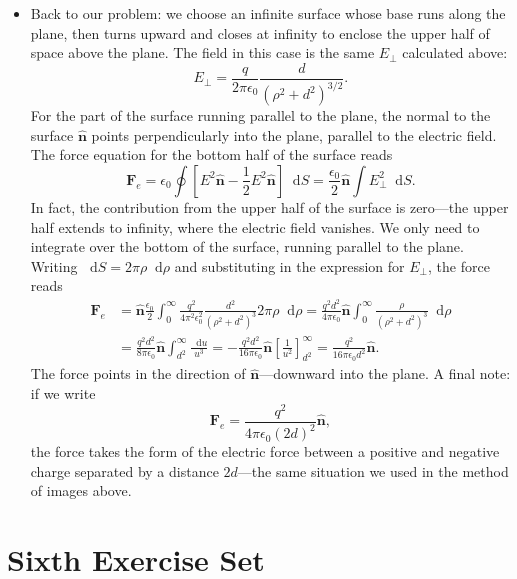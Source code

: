 \documentclass[11pt, a4paper]{article}
\newcommand{\diff}{\mathop{}\!\mathrm{d}} %
\renewcommand{\vec}[1]{\bm{#1}} %
\newcommand{\uvec}[1]{\hat{\vec{#1}}} %
\newcommand{\ee}{\epsilon_{0}}  %
\begin{document}
\begin{itemize}
	\item Back to our problem: we choose an infinite surface whose base runs along the plane, then turns upward and closes at infinity to enclose the upper half of space above the plane. The field in this case is the same $ E_{\perp} $ calculated above:
	\begin{equation*}
		E_{\perp} = \frac{q}{2\pi \ee}\frac{d}{(\rho^{2}+d^{2})^{3/2}}.
	\end{equation*}
	For the part of the surface running parallel to the plane, the normal to the surface $ \uvec{n} $ points perpendicularly into the plane, parallel to the electric field. The force equation for the bottom half of the surface reads 
	\begin{equation*}
		\vec{F}_{e} = \ee \oint \left[E^{2}\uvec{n}- \frac{1}{2}E^{2}\uvec{n}\right]\diff S = \frac{\ee}{2}\uvec{n}\int E_{\perp}^{2}\diff S.
	\end{equation*}
	In fact, the contribution from the upper half of the surface is zero---the upper half extends to infinity, where the electric field vanishes. We only need to integrate over the bottom of the surface, running parallel to the plane. Writing $ \diff S = 2\pi \rho \diff \rho $ and substituting in the expression for $ E_{\perp} $, the force reads
	\begin{align*}
		\vec{F}_{e} &= \uvec{n}\frac{\ee}{2}\int_{0}^{\infty} \frac{q^{2}}{4\pi^{2}\ee^{2}}\frac{d^{2}}{(\rho^{2} + d^{2})^{3}} 2\pi \rho \diff \rho = \frac{q^{2}d^{2}}{4\pi \ee}\uvec{n}\int_{0}^{\infty}\frac{\rho}{(\rho^{2} + d^{2})^{3}} \diff \rho\\
		&=  \frac{q^{2}d^{2}}{8\pi \ee}\uvec{n}\int_{d^{2}}^{\infty}\frac{\diff u}{u^{3}} = - \frac{q^{2}d^{2}}{16\pi \ee}\uvec{n} \left[\frac{1}{u^{2}}\right]_{d^{2}}^{\infty} = \frac{q^{2}}{16\pi \ee d^{2}}\uvec{n}.
	\end{align*}
	The force points in the direction of $ \uvec{n} $---downward into the plane. A final note: if we write
	\begin{equation*}
		\vec{F}_{e} = \frac{q^{2}}{4\pi \ee (2d)^{2}}\uvec{n},
	\end{equation*}
	the force takes the form of the electric force between a positive and negative charge separated by a distance $ 2d $---the same situation we used in the method of images above. 
	
\end{itemize}

\section{Sixth Exercise Set}
\end{document}
